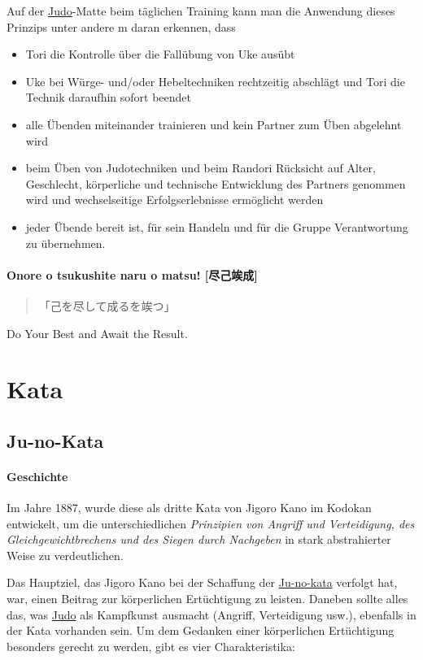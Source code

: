 \documentclass[justified, a4paper, notitlepage, captions=tableheading, nobib]{tufte-handout}
\begin{document}
Auf der \hyperref[org4f88021]{Judo}-Matte beim täglichen Training kann man die Anwendung dieses Prinzips unter andere
m daran erkennen, dass 
\begin{itemize}
\item Tori die Kontrolle über die Fallübung von Uke ausübt
\item Uke bei Würge- und/oder Hebeltechniken rechtzeitig abschlägt und Tori die Technik daraufhin sofort beendet
\item alle Übenden miteinander trainieren und kein Partner zum Üben abgelehnt wird
\item beim Üben von Judotechniken und beim Randori Rücksicht auf Alter, Geschlecht, körperliche und technische  Entwicklung des Partners genommen wird und wechselseitige Erfolgserlebnisse ermöglicht werden
\item jeder Übende bereit ist, für sein Handeln und für die Gruppe Verantwortung zu übernehmen.
\end{itemize}

\paragraph{Onore o tsukushite naru o matsu! [尽己竢成]}
\label{sec:orgb5d3629}
\begin{quote}
「己を尽して成るを竢つ」
\end{quote}

Do Your Best and Await the Result.

\newpage
\section{Kata }
\label{sec:org00b28f5}
\subsection{\label{org278cc0e}Ju-no-Kata}
\label{sec:org5411a7f}
\paragraph{Geschichte}
\label{sec:org2c85985}
Im Jahre 1887, wurde diese als dritte Kata von Jigoro Kano im Kodokan entwickelt, um die unterschiedlichen \emph{Prinzipien von Angriff und Verteidigung, des Gleichgewichtbrechens und des Siegen durch Nachgeben} in stark abstrahierter Weise zu verdeutlichen. 

Das Hauptziel, das Jigoro Kano bei der Schaffung der \hyperref[org278cc0e]{Ju-no-kata} verfolgt hat, war, einen Beitrag zur körperlichen Ertüchtigung zu leisten. 
Daneben sollte alles das, was \hyperref[org4f88021]{Judo} als Kampfkunst ausmacht (Angriff, Verteidigung usw.), ebenfalls in der Kata vorhanden sein. 
Um dem Gedanken einer körperlichen Ertüchtigung besonders gerecht zu werden, gibt es vier Charakteristika:
\end{document}
